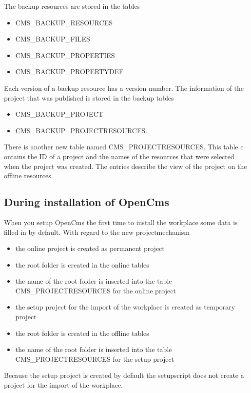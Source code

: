 The backup resources are stored in the tables
\begin{itemize}
\item CMS\_BACKUP\_RESOURCES
\item CMS\_BACKUP\_FILES
\item CMS\_BACKUP\_PROPERTIES
\item CMS\_BACKUP\_PROPERTYDEF
\end{itemize}
Each version of a backup resource has a version number. The
information of the project that was published is stored in the
backup tables

\begin{itemize}
\item CMS\_BACKUP\_PROJECT
\item CMS\_BACKUP\_PROJECTRESOURCES.
\end{itemize}

There is another new table named CMS\_PROJECTRESOURCES. This table
c ontains the ID of a project and the names of the resources that
were selected when the project was created. The entries describe
the view of the project on the offline resources.

\subsection{During installation of OpenCms}

When you setup OpenCms the first time to install the workplace
some data is filled in by default. With regard to the new
projectmechanism

\begin{itemize}
\item the online project is created as permanent project
\item the root folder is created in the online tables
\item the name of the root folder is inserted into the table CMS\_PROJECTRESOURCES for the online project
\item the setup project for the import of the workplace is created as temporary project
\item the root folder is created in the offline tables
\item the name of the root folder is inserted into the table CMS\_PROJECTRESOURCES for the setup project
\end{itemize}

Because the setup project is created by default the setupscript
does not create a project for the import of the workplace.

